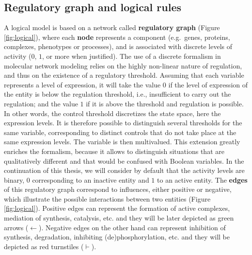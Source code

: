 \documentclass[a4paper,12pt,twoside,onecolumn,openright,final,oldfontcommands]{memoir}
\begin{document}
\subsection{Regulatory graph and logical
rules}\label{regulatory-graph-and-logical-rules}

A logical model is based on a network called \textbf{regulatory graph}
(Figure \ref{fig:logical}), where each \textbf{node} represents a
component (e.g.~genes, proteins, complexes, phenotypes or processes),
and is associated with discrete levels of activity (\(0\), \(1\), or
more when justified). The use of a discrete formalism in molecular
network modeling relies on the highly non-linear nature of regulation,
and thus on the existence of a regulatory threshold. Assuming that each
variable represents a level of expression, it will take the value \(0\)
if the level of expression of the entity is below the regulation
threshold, i.e., insufficient to carry out the regulation; and the value
\(1\) if it is above the threshold and regulation is possible. In other
words, the control threshold discretizes the state space, here the
expression levels. It is therefore possible to distinguish several
thresholds for the same variable, corresponding to distinct controls
that do not take place at the same expression levels. The variable is
then multivalued. This extension greatly enriches the formalism, because
it allows to distinguish situations that are qualitatively different and
that would be confused with Boolean variables. In the continuation of
this thesis, we will consider by default that the activity levels are
binary, \(0\) corresponding to an inactive entity and \(1\) to an active
entity. The \textbf{edges} of this regulatory graph correspond to
influences, either positive or negative, which illustrate the possible
interactions between two entities (Figure \ref{fig:logical}). Positive
edges can represent the formation of active complexes, mediation of
synthesis, catalysis, etc. and they will be later depicted as green
arrows (\(\leftarrow\)). Negative edges on the other hand can represent
inhibition of synthesis, degradation, inhibiting (de)phosphorylation,
etc. and they will be depicted as red turnstiles (\(\vdash\)).
\end{document}
